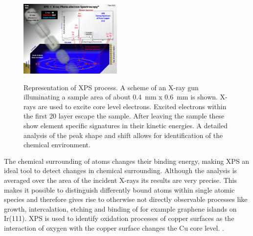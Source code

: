 \begin{figure}\centering
\includegraphics[width=0.45\textwidth]{./images/XPS_PHYSICS}
		\label{fig:XPS-excitation}
	
	\caption{Representation of XPS process. A scheme of an X-ray gun illuminating a sample area of about \SI{0.4}{\milli \meter} x \SI{0.6}{\milli \meter} is shown. X-rays are used to excite core level electrons. Excited electrons within the first 20 layer escape the sample. After leaving the sample these show element specific signatures in their kinetic energies. A detailed analysis of the peak shape and shift allows for identification of the chemical environment.}
	\label{fig:auger-core}
\end{figure}

\cite{zemlyanov_versatile_2018}
The  chemical surrounding of atoms changes their binding energy, making XPS an ideal tool to detect changes in chemical surrounding. Although the analysis is averaged over the area of the incident X-rays its results are very precise. This makes it possible to distinguish differently bound atoms within single atomic species and therefore gives rise to otherwise not directly observable processes like growth, intercalation, etching and binding of for example graphene islands on Ir(111)\cite{busse_graphene_2011-1,granas_oxygen_2012}. XPS is used to identify oxidation processes of copper surfaces as the interaction of oxygen with the copper surface changes the Cu core level. \cite{deroubaix_x-ray_1992}.

